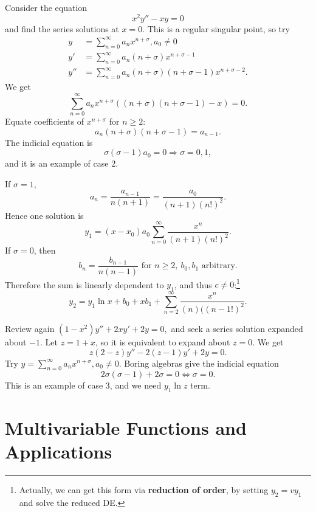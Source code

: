 \documentclass[a4paper]{article}
\begin{document}
    \begin{example}
        Consider the equation
        \begin{equation}\label{eq:19.1}
            x^2y''-xy=0
        \end{equation}
        and find the series solutions at $x=0$. This is a regular singular point, so try
        \begin{align*}
            y&=\sum_{n=0}^{\infty}a_nx^{n+\sigma}, a_0\neq 0\\
            y'&= \sum_{n=0}^{\infty}a_n(n+\sigma)x^{n+\sigma-1}\\
            y''&=\sum_{n=0}^{\infty} a_n(n+\sigma)(n+\sigma-1)x^{n+\sigma-2}.
        \end{align*}
        We get 
        \[
            \sum_{n=0}^{\infty}a_nx^{n+\sigma}\left( (n+\sigma)(n+\sigma-1)-x \right)=0.
        \]
        Equate coefficients of $ x^{n+\sigma} $ for $n\ge 2$:
        \[
            a_n(n+\sigma)(n+\sigma-1)=a_{n-1}.
        \]
        The indicial equation is 
        \[
            \sigma(\sigma-1)a_0=0 \Longrightarrow \sigma=0,1,
        \]
        and it is an example of case 2.

        If $ \sigma=1 $, 
        \[
            a_n = \frac{a_{n-1}}{n(n+1)} = \frac{a_0}{(n+1)(n!)^2}.
        \]
        Hence one solution is 
        \[
            y_1 = (x-x_0) a_0\sum_{n=0}^{\infty} \frac{x^n}{(n+1)(n!)^2}.
        \]
        If $ \sigma=0 $, then 
        \[
            b_n = \frac{b_{n-1}}{n(n-1)} \text{ for }n\ge 2,\ b_0,b_1 \text{ arbitrary}.
        \]
        Therefore the sum is linearly dependent to $y_1$, and thus $c\neq 0$:\footnote{Actually, we can get this form via \textbf{reduction of order}, by setting $y_2=vy_1$ and solve the reduced DE.}
        \[
            y_2 = y_1 \ln x + b_0 + xb_1 + \sum_{n=2}^{\infty}\frac{x^n}{(n)((n-1!)^2}.
        \]
    \end{example}
    \begin{example}
        Review again $(1-x^2)y''+2xy'+2y=0,$ and seek a series solution expanded about $-1$. Let $z=1+x$, so it is equivalent to expand about $z=0$. We get 
        \[
            z(2-z)y''-2(z-1)y'+2y=0.
        \]
        Try $y=\sum_{n=0}^{\infty}a_nx^{n+\sigma}, a_0\neq 0$. Boring algebras give the indicial equation 
        \[
            2\sigma(\sigma-1)+2\sigma=0 \Longleftrightarrow \sigma=0.
        \]
        This is an example of case 3, and we need $ y_1\ln z $ term.
    \end{example}
    \section{Multivariable Functions and Applications}
\end{document}
